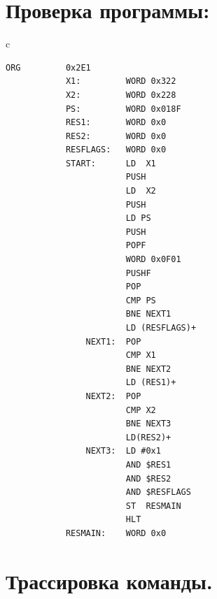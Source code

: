 \section{Проверка программы:}
\begin{center}
    \begin{tabular}{c}
        \begin{lstlisting}[basicstyle=\ttfamily\tiny]
            ORG         0x2E1
            X1:         WORD 0x322
            X2:         WORD 0x228
            PS:         WORD 0x018F
            RES1:       WORD 0x0
            RES2:       WORD 0x0
            RESFLAGS:   WORD 0x0
            START:      LD  X1
                        PUSH
                        LD  X2
                        PUSH
                        LD PS
                        PUSH
                        POPF
                        WORD 0x0F01
                        PUSHF
                        POP
                        CMP PS
                        BNE NEXT1
                        LD (RESFLAGS)+
                NEXT1:  POP
                        CMP X1
                        BNE NEXT2
                        LD (RES1)+
                NEXT2:  POP
                        CMP X2
                        BNE NEXT3
                        LD(RES2)+
                NEXT3:  LD #0x1
                        AND $RES1
                        AND $RES2
                        AND $RESFLAGS
                        ST  RESMAIN
                        HLT
            RESMAIN:    WORD 0x0
        \end{lstlisting}
    \end{tabular}
\end{center}

\section{Трассировка команды.}

